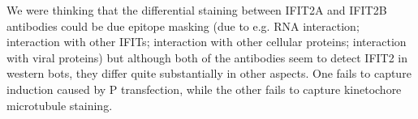 We were thinking that the differential staining between IFIT2A and IFIT2B antibodies could be due epitope masking (due to e.g. RNA interaction; interaction with other IFITs; interaction with other cellular proteins; interaction with viral proteins) but although both of the antibodies seem to detect IFIT2 in western bots, they differ quite substantially in other aspects. One fails to capture induction caused by P transfection, while the other fails to capture kinetochore microtubule staining.